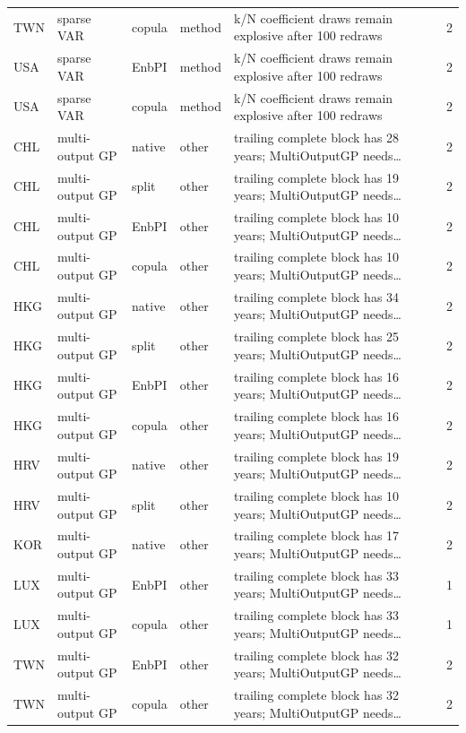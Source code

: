 {\begin{longtable}{@{}lllp{1.6cm}p{6.2cm}r@{}}
TWN & sparse VAR & copula & method & k/N coefficient draws remain explosive after 100 redraws & 2 \\
USA & sparse VAR & EnbPI & method & k/N coefficient draws remain explosive after 100 redraws & 2 \\
USA & sparse VAR & copula & method & k/N coefficient draws remain explosive after 100 redraws & 2 \\
CHL & multi-output GP & native & other & trailing complete block has 28 years; MultiOutputGP needs\ldots & 2 \\
CHL & multi-output GP & split & other & trailing complete block has 19 years; MultiOutputGP needs\ldots & 2 \\
CHL & multi-output GP & EnbPI & other & trailing complete block has 10 years; MultiOutputGP needs\ldots & 2 \\
CHL & multi-output GP & copula & other & trailing complete block has 10 years; MultiOutputGP needs\ldots & 2 \\
HKG & multi-output GP & native & other & trailing complete block has 34 years; MultiOutputGP needs\ldots & 2 \\
HKG & multi-output GP & split & other & trailing complete block has 25 years; MultiOutputGP needs\ldots & 2 \\
HKG & multi-output GP & EnbPI & other & trailing complete block has 16 years; MultiOutputGP needs\ldots & 2 \\
HKG & multi-output GP & copula & other & trailing complete block has 16 years; MultiOutputGP needs\ldots & 2 \\
HRV & multi-output GP & native & other & trailing complete block has 19 years; MultiOutputGP needs\ldots & 2 \\
HRV & multi-output GP & split & other & trailing complete block has 10 years; MultiOutputGP needs\ldots & 2 \\
KOR & multi-output GP & native & other & trailing complete block has 17 years; MultiOutputGP needs\ldots & 2 \\
LUX & multi-output GP & EnbPI & other & trailing complete block has 33 years; MultiOutputGP needs\ldots & 1 \\
LUX & multi-output GP & copula & other & trailing complete block has 33 years; MultiOutputGP needs\ldots & 1 \\
TWN & multi-output GP & EnbPI & other & trailing complete block has 32 years; MultiOutputGP needs\ldots & 2 \\
TWN & multi-output GP & copula & other & trailing complete block has 32 years; MultiOutputGP needs\ldots & 2 \\

\end{longtable}}
